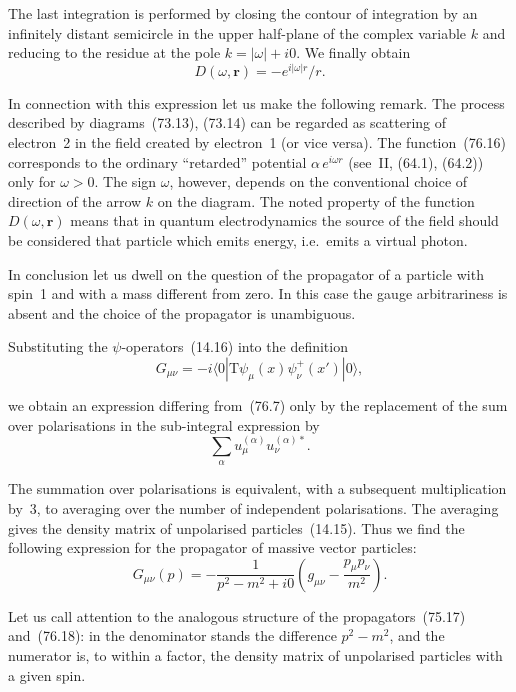 The last integration is performed by closing the contour of integration by an infinitely distant semicircle in the upper half-plane of the complex variable $k$ and reducing to the residue at the pole $k = |\omega| + i0$. We finally obtain
\begin{equation}
D(\omega,\mathbf{r}) = -e^{i|\omega|r}/r.
\tag{76.16}
\end{equation}

In connection with this expression let us make the following remark. The process described by diagrams~(73.13), (73.14) can be regarded as scattering of electron~2 in the field created by electron~1 (or vice versa). The function~(76.16) corresponds to the ordinary ``retarded'' potential $\alpha\,e^{i\omega r}$ (see~II, (64.1), (64.2)) only for $\omega > 0$. The sign $\omega$, however, depends on the conventional choice of direction of the arrow $k$ on the diagram. The noted property of the function $D(\omega,\mathbf{r})$ means that in quantum electrodynamics the source of the field should be considered that particle which emits energy, i.e.\ emits a virtual photon.

In conclusion let us dwell on the question of the propagator of a particle with spin~1 and with a mass different from zero. In this case the gauge arbitrariness is absent and the choice of the propagator is unambiguous.

Substituting the $\psi$-operators~(14.16) into the definition
\begin{equation}
G_{\mu\nu} = -i\langle 0|\mathrm{T}\psi_\mu(x)\psi^+_\nu(x')|0\rangle,
\tag{76.17}
\end{equation}

we obtain an expression differing from~(76.7) only by the replacement of the sum over polarisations in the sub-integral expression by
\[
\sum_\alpha u^{(\alpha)}_\mu u^{(\alpha)*}_\nu.
\]

The summation over polarisations is equivalent, with a subsequent multiplication by~3, to averaging over the number of independent polarisations. The averaging gives the density matrix of unpolarised particles~(14.15). Thus we find the following expression for the propagator of massive vector particles:
\begin{equation}
G_{\mu\nu}(p) = -\frac{1}{p^2 - m^2 + i0}\left(g_{\mu\nu} - \frac{p_\mu p_\nu}{m^2}\right).
\tag{76.18}
\end{equation}

Let us call attention to the analogous structure of the propagators~(75.17) and~(76.18): in the denominator stands the difference $p^2 - m^2$, and the numerator is, to within a factor, the density matrix of unpolarised particles with a given spin.

